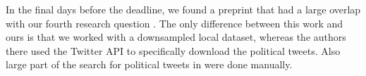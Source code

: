 In the final days before the deadline, we found a preprint that had a large overlap with our fourth research question \cite{tw_useful}. The only difference between this work and ours is that we worked with a downsampled local dataset, whereas the authors there used the Twitter API to specifically download the political tweets. Also  large part of the search for political tweets in \cite{tw_useful} were done manually.